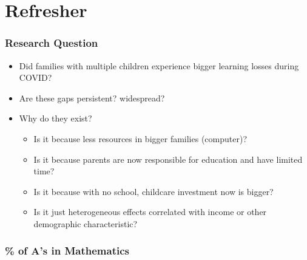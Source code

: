 \documentclass{beamer}
\begin{document}
\section{Refresher}

\begin{frame}
    \label{update_scott}
    \frametitle{Research Question}
      \begin{itemize}
          \item Did families with multiple children experience bigger learning losses during COVID? 
          \item Are these gaps persistent? widespread? 
          \item Why do they exist?
          \begin{itemize}
          \item Is it because less resources in bigger families (computer)?
          \item Is it because parents are now responsible for education and have limited time?
          \item Is it because with no school, childcare investment now is bigger?
          \item Is it just heterogeneous effects correlated with income or other demographic characteristic?
          \end{itemize}
      \end{itemize}
\end{frame}


\begin{frame}
    \label{update_scott}
    \frametitle{\% of A's in Mathematics}
        {
    }
\end{frame}
\end{document}
